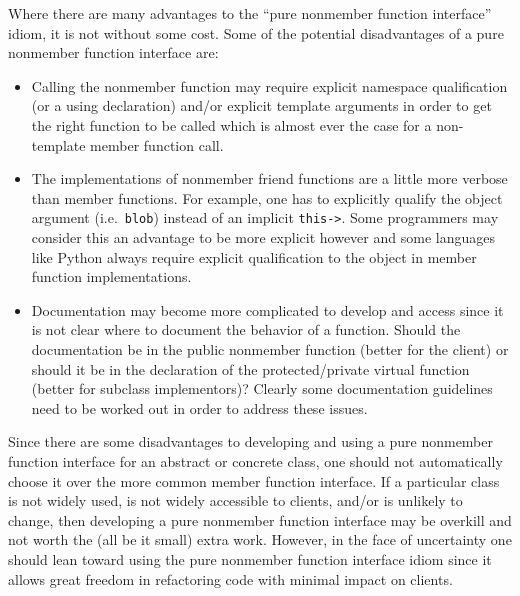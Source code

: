 \documentclass[pdf,ps2pdf,11pt]{SANDreport}
\begin{document}
Where there are many advantages to the ``pure nonmember function interface''
idiom, it is not without some cost.  Some of the potential disadvantages of a
pure nonmember function interface are:

\begin{itemize}

{}\item Calling the nonmember function may require explicit namespace
qualification (or a using declaration) and/or explicit template arguments in
order to get the right function to be called which is almost ever the case for
a non-template member function call.

{}\item The implementations of nonmember friend functions are a little more
verbose than member functions.  For example, one has to explicitly qualify the
object argument (i.e.\ {}\texttt{blob}) instead of an implicit
{}\texttt{this->}.  Some programmers may consider this an advantage to be more
explicit however and some languages like Python always require explicit
qualification to the object in member function implementations.

{}\item Documentation may become more complicated to develop and access since
it is not clear where to document the behavior of a function.  Should the
documentation be in the public nonmember function (better for the client) or
should it be in the declaration of the protected/private virtual function
(better for subclass implementors)?  Clearly some documentation guidelines
need to be worked out in order to address these issues.

\end{itemize}

Since there are some disadvantages to developing and using a pure nonmember
function interface for an abstract or concrete class, one should not
automatically choose it over the more common member function interface.  If a
particular class is not widely used, is not widely accessible to clients,
and/or is unlikely to change, then developing a pure nonmember function
interface may be overkill and not worth the (all be it small) extra work.
However, in the face of uncertainty one should lean toward using the pure
nonmember function interface idiom since it allows great freedom in
refactoring code with minimal impact on clients.


%
\clearpage



%
%

\end{document}
